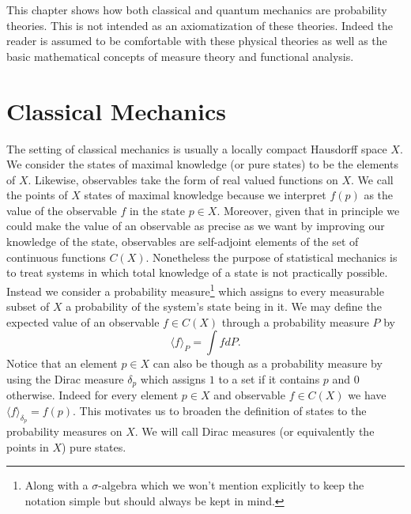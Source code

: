 This chapter shows how both classical and quantum mechanics are probability theories. This is not intended as an axiomatization of these theories. Indeed the reader is assumed to be comfortable with these physical theories as well as the basic mathematical concepts of measure theory and functional analysis.

\section{Classical Mechanics}\label{sec:classical_probability}

The setting of classical mechanics is usually a locally compact Hausdorff space $X$. We consider the states of maximal knowledge (or pure states) to be the elements of $X$. Likewise, observables take the form of real valued functions on $X$. We call the points of $X$ states of maximal knowledge because we interpret $f(p)$ as the value of the observable $f$ in the state $p\in X$. Moreover, given that in principle we could make the value of an observable as precise as we want by improving our knowledge of the state, observables are self-adjoint elements of the set of continuous functions $C(X)$. Nonetheless the purpose of statistical mechanics is to treat systems in which total knowledge of a state is not practically possible. Instead we consider a probability measure\footnote{Along with a $\sigma$-algebra which we won't mention explicitly to keep the notation simple but should always be kept in mind.} which assigns to every measurable subset of $X$ a probability of the system's state being in it. We may define the expected value of an observable $f\in C(X)$ through a probability measure $P$ by 
\begin{equation}\label{eq:classical_states}
\langle f \rangle_P = \int fdP.
\end{equation}  
Notice that an element $p\in X$ can also be though as a probability measure by using the Dirac measure $\delta_p$ which assigns $1$ to a set if it contains $p$ and $0$ otherwise. Indeed for every element $p \in X$ and observable $f \in C(X)$ we have $\langle f \rangle_{\delta_p} = f(p)$. This motivates us to broaden the definition of states to the probability measures on $X$. We will call Dirac measures (or equivalently the points in $X$) pure states.

